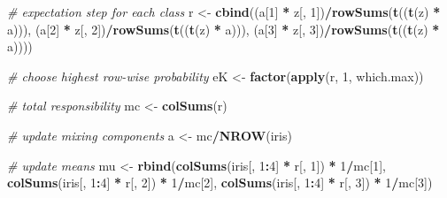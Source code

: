 \documentclass[12pt]{article}
\newenvironment{Shaded}{\begin{snugshade}}{\end{snugshade}}
\newcommand{\CommentTok}[1]{\textcolor[rgb]{0.56,0.35,0.01}{\textit{#1}}}
\newcommand{\DecValTok}[1]{\textcolor[rgb]{0.00,0.00,0.81}{#1}}
\newcommand{\FunctionTok}[1]{\textcolor[rgb]{0.13,0.29,0.53}{\textbf{#1}}}
\newcommand{\NormalTok}[1]{#1}
\newcommand{\OtherTok}[1]{\textcolor[rgb]{0.56,0.35,0.01}{#1}}
\newcommand{\SpecialCharTok}[1]{\textcolor[rgb]{0.81,0.36,0.00}{\textbf{#1}}}
\begin{document}
\begin{Shaded}
\begin{Highlighting}[]
\CommentTok{\# expectation step for each class}
\NormalTok{r }\OtherTok{\textless{}{-}} \FunctionTok{cbind}\NormalTok{((a[}\DecValTok{1}\NormalTok{] }\SpecialCharTok{*}\NormalTok{ z[, }\DecValTok{1}\NormalTok{])}\SpecialCharTok{/}\FunctionTok{rowSums}\NormalTok{(}\FunctionTok{t}\NormalTok{((}\FunctionTok{t}\NormalTok{(z) }\SpecialCharTok{*}\NormalTok{ a))), (a[}\DecValTok{2}\NormalTok{] }\SpecialCharTok{*}\NormalTok{ z[, }\DecValTok{2}\NormalTok{])}\SpecialCharTok{/}\FunctionTok{rowSums}\NormalTok{(}\FunctionTok{t}\NormalTok{((}\FunctionTok{t}\NormalTok{(z) }\SpecialCharTok{*} 
\NormalTok{    a))), (a[}\DecValTok{3}\NormalTok{] }\SpecialCharTok{*}\NormalTok{ z[, }\DecValTok{3}\NormalTok{])}\SpecialCharTok{/}\FunctionTok{rowSums}\NormalTok{(}\FunctionTok{t}\NormalTok{((}\FunctionTok{t}\NormalTok{(z) }\SpecialCharTok{*}\NormalTok{ a))))}

\CommentTok{\# choose highest row{-}wise probability}
\NormalTok{eK }\OtherTok{\textless{}{-}} \FunctionTok{factor}\NormalTok{(}\FunctionTok{apply}\NormalTok{(r, }\DecValTok{1}\NormalTok{, which.max))}

\CommentTok{\# total responsibility}
\NormalTok{mc }\OtherTok{\textless{}{-}} \FunctionTok{colSums}\NormalTok{(r)}

\CommentTok{\# update mixing components}
\NormalTok{a }\OtherTok{\textless{}{-}}\NormalTok{ mc}\SpecialCharTok{/}\FunctionTok{NROW}\NormalTok{(iris)}

\CommentTok{\# update means}
\NormalTok{mu }\OtherTok{\textless{}{-}} \FunctionTok{rbind}\NormalTok{(}\FunctionTok{colSums}\NormalTok{(iris[, }\DecValTok{1}\SpecialCharTok{:}\DecValTok{4}\NormalTok{] }\SpecialCharTok{*}\NormalTok{ r[, }\DecValTok{1}\NormalTok{]) }\SpecialCharTok{*} \DecValTok{1}\SpecialCharTok{/}\NormalTok{mc[}\DecValTok{1}\NormalTok{], }\FunctionTok{colSums}\NormalTok{(iris[, }\DecValTok{1}\SpecialCharTok{:}\DecValTok{4}\NormalTok{] }\SpecialCharTok{*} 
\NormalTok{    r[, }\DecValTok{2}\NormalTok{]) }\SpecialCharTok{*} \DecValTok{1}\SpecialCharTok{/}\NormalTok{mc[}\DecValTok{2}\NormalTok{], }\FunctionTok{colSums}\NormalTok{(iris[, }\DecValTok{1}\SpecialCharTok{:}\DecValTok{4}\NormalTok{] }\SpecialCharTok{*}\NormalTok{ r[, }\DecValTok{3}\NormalTok{]) }\SpecialCharTok{*} \DecValTok{1}\SpecialCharTok{/}\NormalTok{mc[}\DecValTok{3}\NormalTok{])}


\end{Highlighting}
\end{Shaded}
\end{document}
